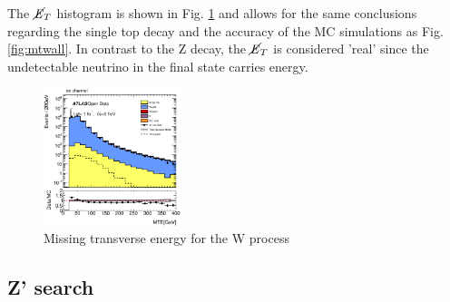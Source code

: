 \documentclass[runningheads,a4paper]{llncs}
\begin{document}
The $\cancel{\it{E}}_{T}$ histogram is shown in Fig. \ref{fig:mtewall} and allows for the same conclusions regarding the single top decay and the accuracy of the MC simulations as Fig. \ref{fig:mtwall}. In contrast to the Z decay, the $\cancel{\it{E}}_{T}$ is considered 'real' since the undetectable neutrino in the final state carries energy.

\begin{figure}
\centering
\includegraphics[height=4cm]{ee_mtew_with_dataegamma}
\caption{Missing transverse energy for the W process}
\label{fig:mtewall}
\end{figure}


\subsection{Z' search}


\end{document}
